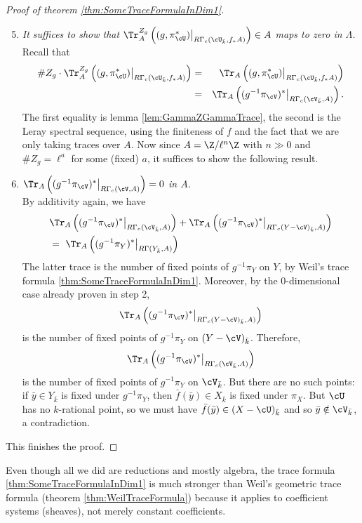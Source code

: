 \begin{proof}[Proof of theorem \ref{thm:SomeTraceFormulaInDim1}]
\begin{enumerate}[\it Step 1.]
\setcounter{enumi}{4}
\item 
{\it  
It suffices to show that  $\Tr_A^{Z_g}\left((g, \pi_\cU^*)\big|_{R\Gamma_c(\cU_{\bar k}, f_*A)}\right) \in A$ maps to zero in $\Lambda$. 
}\\
Recall that 
\begin{eqnarray*}
\# Z_g \cdot \Tr_A^{Z_g}\left((g, \pi_\cU^*)\big|_{R\Gamma_c(\cU_{\bar k}, f_*A)}\right) 
& = & \Tr_A\left((g, \pi_\cU^*)\big|_{R\Gamma_c(\cU_{\bar k}, f_*A)}\right)\\
& = & \Tr_A\left((g^{-1}\pi_\cV)^*\big|_{R\Gamma_c(\cV_{\bar k}, A)}\right).
\end{eqnarray*}
The first equality is lemma \ref{lem:GammaZGammaTrace}, the second is the Leray spectral sequence, using the finiteness of $f$ and the fact that we are only taking traces over $A$. Now since $A=\Z/\ell^n\Z$ with $n\gg 0$ and $\# Z_g=\ell^a$ for some (fixed) $a$, it suffices to show the following result.
\item
{\it $\Tr_A\left((g^{-1}\pi_\cV)^*\big|_{R\Gamma_c(\cV, A)}\right) = 0$ in $A$.} \\
By additivity again, we have
\begin{eqnarray*}
&  \Tr_A\left((g^{-1}\pi_\cV)^*\big|_{R\Gamma_c(\cV_{\bar k}, A)}\right)+\Tr_A\left((g^{-1}\pi_\cV)^*\big|_{R\Gamma_c(Y-\cV)_{\bar k}, A)}\right) 
\\
& = \ \Tr_A\left((g^{-1}\pi_Y)^*\big|_{R\Gamma(Y_{\bar k}, A)}\right)
\end{eqnarray*}
The latter trace is the number of fixed points of $g^{-1}\pi_Y$ on $Y$, by Weil's trace formula \ref{thm:SomeTraceFormulaInDim1}. Moreover, by the 0-dimensional case already proven in step 2, 
$$
\Tr_A\left((g^{-1}\pi_\cV)^*\big|_{R\Gamma_c(Y-\cV)_{\bar k}, A)}\right)
$$ 
is the number of fixed points of $g^{-1}\pi_Y$ on $(Y-\cV)_{\bar k}$. Therefore, 
$$
\Tr_A\left((g^{-1}\pi_\cV)^*\big|_{R\Gamma_c(\cV_{\bar k}, A)}\right)
$$ 
is the number of fixed points of $g^{-1}\pi_Y$ on $\cV_{\bar k}$. But there are no such points: if $\bar y\in Y_{\bar k}$ is fixed under $g^{-1}\pi_Y$, then $\bar f(\bar y) \in X_{\bar k}$ is fixed under $\pi_X$. But $\cU$ has no $k$-rational point, so we must have $\bar f(\bar y)\in (X-\cU)_{\bar k}$ and so $\bar y\notin \cV_{\bar k}$, a contradiction. 
\end{enumerate}
This finishes the proof.
\end{proof}

\begin{remark}
Even though all we did are reductions and mostly algebra, the trace formula \ref{thm:SomeTraceFormulaInDim1} is much stronger than Weil's geometric trace formula (theorem \ref{thm:WeilTraceFormula}) because it applies to coefficient systems (sheaves), not merely constant coefficients. 
\end{remark}

